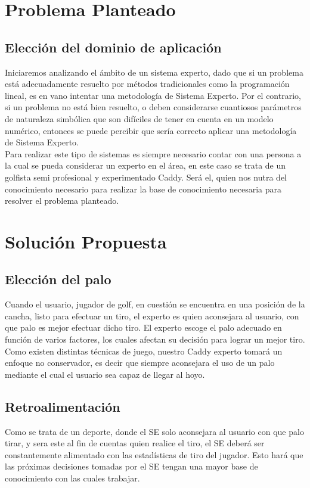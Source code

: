 \documentclass[runningheads,a4paper]{llncs}
\begin{document}
\section{Problema Planteado}
\subsection{Elección del dominio de aplicación}
Iniciaremos analizando el ámbito de un sistema experto, dado que si un problema está adecuadamente resuelto por métodos tradicionales como la programación lineal, es en vano intentar una metodología de Sistema Experto. Por el contrario, si un problema no está bien resuelto, o deben considerarse cuantiosos parámetros de naturaleza simbólica que son difíciles de tener en cuenta en un modelo numérico, entonces se puede percibir que sería correcto aplicar una metodología de Sistema Experto.\\
Para realizar este tipo de sistemas es siempre necesario contar con una persona a la cual se pueda considerar un experto en el área, en este caso se trata de un golfista semi profesional y experimentado Caddy. Será el, quien nos nutra del conocimiento necesario para realizar la base de conocimiento necesaria para resolver el problema planteado.\\

\section{Solución Propuesta}
\subsection{Elección del palo}
Cuando el usuario, jugador de golf, en cuestión se encuentra en una posición de la cancha, listo para efectuar un tiro, el experto es quien aconsejara al usuario, con que palo es mejor efectuar dicho tiro. El experto escoge el palo adecuado en función de varios factores, los cuales afectan su decisión para lograr un mejor tiro.\\
	Como existen distintas técnicas de juego, nuestro Caddy experto tomará un enfoque no conservador, es decir que siempre aconsejara el uso de un palo mediante el cual el usuario sea capaz de llegar al hoyo.
	
\subsection{Retroalimentación}
Como se trata de un deporte, donde el SE solo aconsejara al usuario con que palo tirar, y sera este al fin de cuentas quien realice el tiro, el SE deberá ser constantemente alimentado con las estadísticas de tiro del jugador. Esto hará que las próximas decisiones tomadas por el SE tengan una mayor base de conocimiento con las cuales trabajar.\\
 
\end{document}
